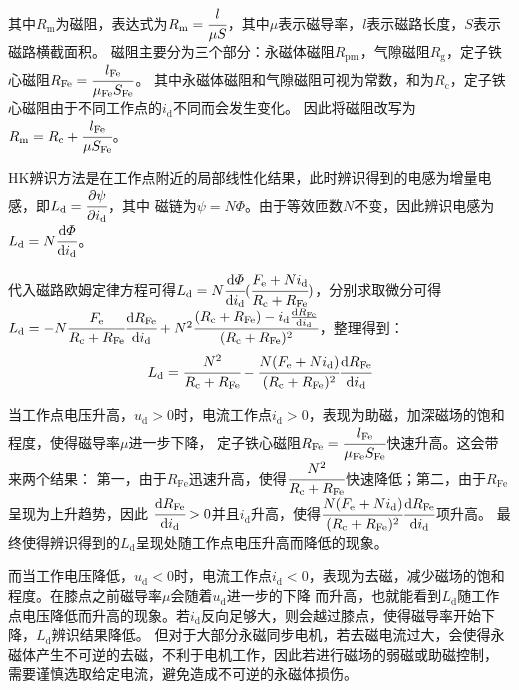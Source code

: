 其中\(R_{\mathrm{m}}\)为磁阻，表达式为\(R_{\mathrm{m}}=\cfrac{l}{\mu S}\)，其中\(\mu\)表示磁导率，\(l\)表示磁路长度，\(S\)表示磁路横截面积。
磁阻主要分为三个部分：永磁体磁阻\(R_{\mathrm{pm}}\)，气隙磁阻\(R_{\mathrm{g}}\)，定子铁心磁阻\(R_{\mathrm{Fe}}=\cfrac{l_{\mathrm{Fe}}}{\mu_{\mathrm{Fe}} S_{\mathrm{Fe}}}\)。
其中永磁体磁阻和气隙磁阻可视为常数，和为\(R_{\mathrm{c}}\)，定子铁心磁阻由于不同工作点的\(i_{\mathrm{d}}\)不同而会发生变化。
因此将磁阻改写为\(R_{\mathrm{m}}=R_{\mathrm{c}}+\cfrac{l_{\mathrm{Fe}}}{\mu S_{\mathrm{Fe}}}\)。

HK辨识方法是在工作点附近的局部线性化结果，此时辨识得到的电感为增量电感，即\(L_{\mathrm{d}}=\cfrac{\partial\psi}{\partial i_{\mathrm{d}}}\)，其中
磁链为\(\psi=N\varPhi\)。由于等效匝数\(N\)不变，因此辨识电感为\(L_{\mathrm{d}}=N\cfrac{\mathrm{d}\varPhi}{\mathrm{d} i_{\mathrm{d}}}\)。

代入磁路欧姆定律方程可得\(L_{\mathrm{d}}=N\cfrac{\mathrm{d}\varPhi}{\mathrm{d} i_{\mathrm{d}}}(\cfrac{F_{\mathrm{e}}+Ni_{\mathrm{d}}}{R_{\mathrm{c}}+R_{\mathrm{Fe}}})\)，分别求取微分可得
\(L_{\mathrm{d}}=-N\cfrac{F_{\mathrm{e}}}{R_{\mathrm{c}}+R_{\mathrm{Fe}}}\cfrac{\mathrm{d} R_{\mathrm{Fe}}}{\mathrm{d} i_{\mathrm{d}}}+N^2\cfrac{(R_{\mathrm{c}}+R_{\mathrm{Fe}})-i_{\mathrm{d}}\frac{\mathrm{d} R_{\mathrm{Fe}}}{\mathrm{d} i_{\mathrm{d}}}}{(R_{\mathrm{c}}+R_{\mathrm{Fe}})^2}\)，整理得到：
\begin{equation*}
    L_{\mathrm{d}}=\cfrac{N^2}{R_{\mathrm{c}}+R_{\mathrm{Fe}}}-\cfrac{N(F_{\mathrm{e}}+Ni_{\mathrm{d}})}{(R_{\mathrm{c}}+R_{\mathrm{Fe}})^2}\cfrac{\mathrm{d} R_{\mathrm{Fe}}}{\mathrm{d} i_{\mathrm{d}}}
\end{equation*}

当工作点电压升高，\(u_{\mathrm{d}}>0\)时，电流工作点\(i_{\mathrm{d}}>0\)，表现为助磁，加深磁场的饱和程度，使得磁导率\(\mu\)进一步下降，
定子铁心磁阻\(R_{\mathrm{Fe}}=\cfrac{l_{\mathrm{Fe}}}{\mu_{\mathrm{Fe}} S_{\mathrm{Fe}}}\)快速升高。这会带来两个结果：
第一，由于\(R_{\mathrm{Fe}}\)迅速升高，使得\(\cfrac{N^2}{R_{\mathrm{c}}+R_{\mathrm{Fe}}}\)快速降低；第二，由于\(R_{\mathrm{Fe}}\)呈现为上升趋势，因此
\(\cfrac{\mathrm{d} R_{\mathrm{Fe}}}{\mathrm{d} i_{\mathrm{d}}}>0\)并且\(i_{\mathrm{d}}\)升高，使得\(\cfrac{N(F_{\mathrm{e}}+Ni_{\mathrm{d}})}{(R_{\mathrm{c}}+R_{\mathrm{Fe}})^2}\cfrac{\mathrm{d} R_{\mathrm{Fe}}}{\mathrm{d} i_{\mathrm{d}}}\)项升高。
最终使得辨识得到的\(L_{\mathrm{d}}\)呈现处随工作点电压升高而降低的现象。

而当工作电压降低，\(u_{\mathrm{d}}<0\)时，电流工作点\(i_{\mathrm{d}}<0\)，表现为去磁，减少磁场的饱和程度。在膝点之前磁导率\(\mu\)会随着\(u_{\mathrm{d}}\)进一步的下降
而升高，也就能看到\(L_{\mathrm{d}}\)随工作点电压降低而升高的现象。若\(i_{\mathrm{d}}\)反向足够大，则会越过膝点，使得磁导率开始下降，\(L_{\mathrm{d}}\)辨识结果降低。
但对于大部分永磁同步电机，若去磁电流过大，会使得永磁体产生不可逆的去磁，不利于电机工作，因此若进行磁场的弱磁或助磁控制，
需要谨慎选取给定电流，避免造成不可逆的永磁体损伤。


